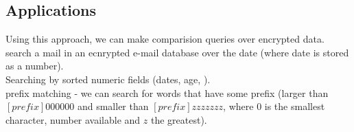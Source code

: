 \documentclass[a4paper, 12pt, oneside]{article}
\begin{document}
\subsection*{Applications}

Using this approach, we can make comparision queries over encrypted data. \\


search a mail in an ecnrypted e-mail database over the date (where date is stored as a number). \\

Searching by sorted numeric fields (dates, age, ).\\

prefix matching - we can search for words that have some prefix (larger than $[prefix]000000$ and smaller than $[prefix]zzzzzzz$, where $0$ is the smallest character, number available and $z$ the greatest).
\end{document}
